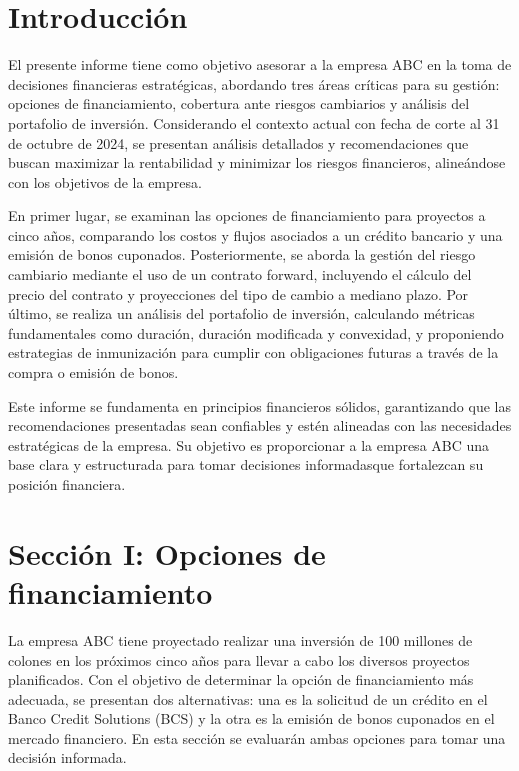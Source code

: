 \documentclass[12pt]{article}
\begin{document}
\pagebreak



\setcounter{page}{1}


\section{Introducción}

El presente informe tiene como objetivo asesorar a la empresa ABC en la toma de decisiones financieras estratégicas, abordando tres áreas críticas para su gestión: opciones de financiamiento, cobertura ante riesgos cambiarios y análisis del portafolio de inversión. Considerando el contexto actual con fecha de corte al 31 de octubre de 2024, se presentan análisis detallados y recomendaciones que buscan maximizar la rentabilidad y minimizar los riesgos financieros, alineándose con los objetivos de la empresa.

En primer lugar, se examinan las opciones de financiamiento para proyectos a cinco años, comparando los costos y flujos asociados a un crédito bancario y una emisión de bonos cuponados. Posteriormente, se aborda la gestión del riesgo cambiario mediante el uso de un contrato forward, incluyendo el cálculo del precio del contrato y proyecciones del tipo de cambio a mediano plazo. Por último, se realiza un análisis del portafolio de inversión, calculando métricas fundamentales como duración, duración modificada y convexidad, y proponiendo estrategias de inmunización para cumplir con obligaciones futuras a través de la compra o emisión de bonos.

Este informe se fundamenta en principios financieros sólidos, garantizando que las recomendaciones presentadas sean confiables y estén alineadas con las necesidades estratégicas de la empresa. Su objetivo es proporcionar a la empresa ABC una base clara y estructurada para tomar decisiones informadasque fortalezcan su posición financiera.


\newpage
\section{Sección I: Opciones de financiamiento}

La empresa ABC tiene proyectado realizar una inversión de 100 millones de colones en los próximos cinco años para llevar a cabo los diversos proyectos planificados. Con el objetivo de determinar la opción de financiamiento más adecuada, se presentan dos alternativas: una es la solicitud de un crédito en el Banco Credit Solutions (BCS) y la otra es la emisión de bonos cuponados en el mercado financiero. En esta sección se evaluarán ambas opciones para tomar una decisión informada.
\end{document}
